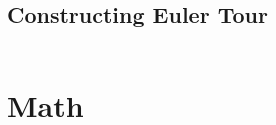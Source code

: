 \documentclass[a4paper]{article}
\begin{document}
  

  \subsection{Constructing Euler Tour}
  \inputminted{cpp}{src/graph_euler.cpp}
  
  \section{Math}

  
 
  
  
\end{document}
